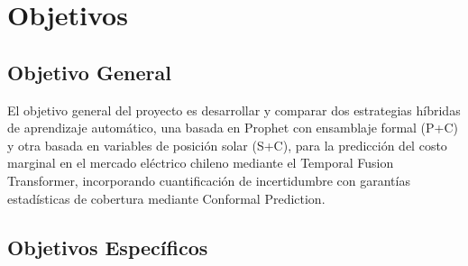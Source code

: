 \section{Objetivos}

\subsection{Objetivo General}

El objetivo general del proyecto es desarrollar y comparar dos estrategias híbridas de aprendizaje automático, una basada en Prophet con ensamblaje formal (P+C) y otra basada en variables de posición solar (S+C), para la predicción del costo marginal en el mercado eléctrico chileno mediante el Temporal Fusion Transformer, incorporando cuantificación de incertidumbre con garantías estadísticas de cobertura mediante Conformal Prediction.

\subsection{Objetivos Específicos}

